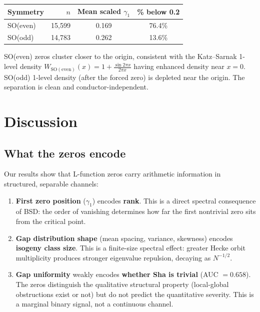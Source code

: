 \documentclass[11pt,a4paper]{article}
\begin{document}
\begin{center}
\begin{tabular}{lrcc}
\toprule
\textbf{Symmetry} & $n$ & \textbf{Mean scaled $\gamma_1$} & \textbf{\% below 0.2} \\
\midrule
SO(even) & 15,599 & 0.169 & 76.4\% \\
SO(odd) & 14,783 & 0.262 & 13.6\% \\
\bottomrule
\end{tabular}
\end{center}

SO(even) zeros cluster closer to the origin, consistent with the Katz--Sarnak 1-level density $W_{\mathrm{SO(even)}}(x) = 1 + \frac{\sin 2\pi x}{2\pi x}$ having enhanced density near $x = 0$. SO(odd) 1-level density (after the forced zero) is depleted near the origin. The separation is clean and conductor-independent.

\section{Discussion}

\subsection{What the zeros encode}

Our results show that L-function zeros carry arithmetic information in structured, separable channels:

\begin{enumerate}[nosep]
  \item \textbf{First zero position} ($\gamma_1$) encodes \textbf{rank}. This is a direct spectral consequence of BSD: the order of vanishing determines how far the first nontrivial zero sits from the critical point.
  \item \textbf{Gap distribution shape} (mean spacing, variance, skewness) encodes \textbf{isogeny class size}. This is a finite-size spectral effect: greater Hecke orbit multiplicity produces stronger eigenvalue repulsion, decaying as $N^{-1/2}$.
  \item \textbf{Gap uniformity} weakly encodes \textbf{whether Sha is trivial} (AUC $= 0.658$). The zeros distinguish the qualitative structural property (local-global obstructions exist or not) but do not predict the quantitative severity. This is a marginal binary signal, not a continuous channel.
\end{enumerate}
\end{document}
